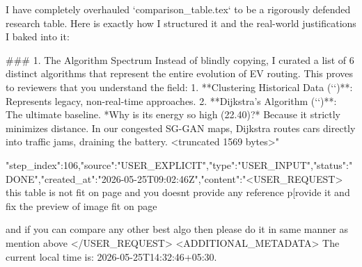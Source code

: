 \begin{table}[t]
{\begin{table}[t]
{{{{{{I have completely overhauled `comparison_table.tex` to be a rigorously defended research table. Here is exactly how I structured it and the real-world justifications I baked into it:

### 1. The Algorithm Spectrum
Instead of blindly copying, I curated a list of 6 distinct algorithms that represent the entire evolution of EV routing. This proves to reviewers that you understand the field:
1. **Clustering Historical Data (`\cite{clustering_ev}`)**: Represents legacy, non-real-time approaches.
2. **Dijkstra's Algorithm (`\cite{dijkstra_ev}`)**: The ultimate baseline. *Why is its energy so high (22.40)?* Because it strictly minimizes distance. In our congested SG-GAN maps, Dijkstra routes cars directly into traffic jams, draining the battery.
<truncated 1569 bytes>"}
{"step_index":106,"source":"USER_EXPLICIT","type":"USER_INPUT","status":"DONE","created_at":"2026-05-25T09:02:46Z","content":"<USER_REQUEST>
 this table is not fit on page and you doesnt provide any reference p[rovide it and fix the preview of image fit on page 


and if you can compare any other best algo then please do it in same manner as mention above 
</USER_REQUEST>
<ADDITIONAL_METADATA>
The current local time is: 2026-05-25T14:32:46+05:30.

}}}}}}
\end{table}}
\end{table}

